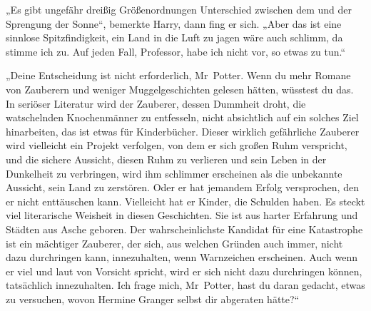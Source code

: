 „Es gibt ungefähr dreißig Größenordnungen Unterschied zwischen dem und der Sprengung der Sonne“, bemerkte Harry, dann fing er sich. „Aber das ist eine sinnlose Spitzfindigkeit, ein Land in die Luft zu jagen wäre auch schlimm, da stimme ich zu. Auf jeden Fall, Professor, habe ich nicht vor, so etwas zu tun.“

„Deine Entscheidung ist nicht erforderlich, Mr~Potter. Wenn du mehr Romane von Zauberern und weniger Muggelgeschichten gelesen hätten, wüsstest du das. In seriöser Literatur wird der Zauberer, dessen Dummheit droht, die watschelnden Knochenmänner zu entfesseln, nicht absichtlich auf ein solches Ziel hinarbeiten, das ist etwas für Kinderbücher. Dieser wirklich gefährliche Zauberer wird vielleicht ein Projekt verfolgen, von dem er sich großen Ruhm verspricht, und die sichere Aussicht, diesen Ruhm zu verlieren und sein Leben in der Dunkelheit zu verbringen, wird ihm schlimmer erscheinen als die unbekannte Aussicht, sein Land zu zerstören. Oder er hat jemandem Erfolg versprochen, den er nicht enttäuschen kann. Vielleicht hat er Kinder, die Schulden haben. Es steckt viel literarische Weisheit in diesen Geschichten. Sie ist aus harter Erfahrung und Städten aus Asche geboren. Der wahrscheinlichste Kandidat für eine Katastrophe ist ein mächtiger Zauberer, der sich, aus welchen Gründen auch immer, nicht dazu durchringen kann, innezuhalten, wenn Warnzeichen erscheinen. Auch wenn er viel und laut von Vorsicht spricht, wird er sich nicht dazu durchringen können, tatsächlich innezuhalten. Ich frage mich, Mr~Potter, hast du daran gedacht, etwas zu versuchen, wovon Hermine Granger selbst dir abgeraten hätte?“

